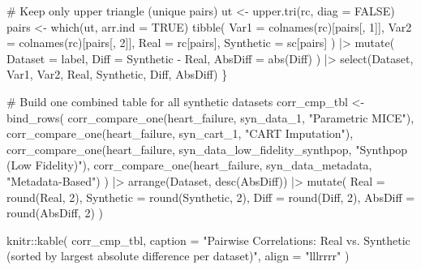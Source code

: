\documentclass[
  letterpaper,
  DIV=11,
  numbers=noendperiod]{scrartcl}
\newenvironment{Shaded}{\begin{snugshade}}{\end{snugshade}}
\newcommand{\AttributeTok}[1]{\textcolor[rgb]{0.40,0.45,0.13}{#1}}
\newcommand{\CommentTok}[1]{\textcolor[rgb]{0.37,0.37,0.37}{#1}}
\newcommand{\ConstantTok}[1]{\textcolor[rgb]{0.56,0.35,0.01}{#1}}
\newcommand{\DecValTok}[1]{\textcolor[rgb]{0.68,0.00,0.00}{#1}}
\newcommand{\FunctionTok}[1]{\textcolor[rgb]{0.28,0.35,0.67}{#1}}
\newcommand{\NormalTok}[1]{\textcolor[rgb]{0.00,0.23,0.31}{#1}}
\newcommand{\OtherTok}[1]{\textcolor[rgb]{0.00,0.23,0.31}{#1}}
\newcommand{\SpecialCharTok}[1]{\textcolor[rgb]{0.37,0.37,0.37}{#1}}
\newcommand{\StringTok}[1]{\textcolor[rgb]{0.13,0.47,0.30}{#1}}
\begin{document}
\begin{Shaded}
\begin{Highlighting}[]
  \CommentTok{\# Keep only upper triangle (unique pairs)}
\NormalTok{  ut }\OtherTok{\textless{}{-}} \FunctionTok{upper.tri}\NormalTok{(rc, }\AttributeTok{diag =} \ConstantTok{FALSE}\NormalTok{)}
\NormalTok{  pairs }\OtherTok{\textless{}{-}} \FunctionTok{which}\NormalTok{(ut, }\AttributeTok{arr.ind =} \ConstantTok{TRUE}\NormalTok{)}
  \FunctionTok{tibble}\NormalTok{(}
    \AttributeTok{Var1 =} \FunctionTok{colnames}\NormalTok{(rc)[pairs[, }\DecValTok{1}\NormalTok{]],}
    \AttributeTok{Var2 =} \FunctionTok{colnames}\NormalTok{(rc)[pairs[, }\DecValTok{2}\NormalTok{]],}
    \AttributeTok{Real =}\NormalTok{ rc[pairs],}
    \AttributeTok{Synthetic =}\NormalTok{ sc[pairs]}
\NormalTok{  ) }\SpecialCharTok{|\textgreater{}}
    \FunctionTok{mutate}\NormalTok{(}
      \AttributeTok{Dataset =}\NormalTok{ label,}
      \AttributeTok{Diff =}\NormalTok{ Synthetic }\SpecialCharTok{{-}}\NormalTok{ Real,}
      \AttributeTok{AbsDiff =} \FunctionTok{abs}\NormalTok{(Diff)}
\NormalTok{    ) }\SpecialCharTok{|\textgreater{}}
    \FunctionTok{select}\NormalTok{(Dataset, Var1, Var2, Real, Synthetic, Diff, AbsDiff)}
\NormalTok{\}}

\CommentTok{\# Build one combined table for all synthetic datasets}
\NormalTok{corr\_cmp\_tbl }\OtherTok{\textless{}{-}} \FunctionTok{bind\_rows}\NormalTok{(}
  \FunctionTok{corr\_compare\_one}\NormalTok{(heart\_failure, syn\_data\_1, }\StringTok{"Parametric MICE"}\NormalTok{),}
  \FunctionTok{corr\_compare\_one}\NormalTok{(heart\_failure, syn\_cart\_1, }\StringTok{"CART Imputation"}\NormalTok{),}
  \FunctionTok{corr\_compare\_one}\NormalTok{(heart\_failure, syn\_data\_low\_fidelity\_synthpop, }\StringTok{"Synthpop (Low Fidelity)"}\NormalTok{),}
  \FunctionTok{corr\_compare\_one}\NormalTok{(heart\_failure, syn\_data\_metadata, }\StringTok{"Metadata{-}Based"}\NormalTok{)}
\NormalTok{) }\SpecialCharTok{|\textgreater{}}
  \FunctionTok{arrange}\NormalTok{(Dataset, }\FunctionTok{desc}\NormalTok{(AbsDiff)) }\SpecialCharTok{|\textgreater{}}
  \FunctionTok{mutate}\NormalTok{(}
    \AttributeTok{Real =} \FunctionTok{round}\NormalTok{(Real, }\DecValTok{2}\NormalTok{),}
    \AttributeTok{Synthetic =} \FunctionTok{round}\NormalTok{(Synthetic, }\DecValTok{2}\NormalTok{),}
    \AttributeTok{Diff =} \FunctionTok{round}\NormalTok{(Diff, }\DecValTok{2}\NormalTok{),}
    \AttributeTok{AbsDiff =} \FunctionTok{round}\NormalTok{(AbsDiff, }\DecValTok{2}\NormalTok{)}
\NormalTok{  )}

\NormalTok{knitr}\SpecialCharTok{::}\FunctionTok{kable}\NormalTok{(}
\NormalTok{  corr\_cmp\_tbl,}
  \AttributeTok{caption =} \StringTok{"Pairwise Correlations: Real vs. Synthetic (sorted by largest absolute difference per dataset)"}\NormalTok{,}
  \AttributeTok{align =} \StringTok{"lllrrrr"}
\NormalTok{)}
\end{Highlighting}
\end{Shaded}
\end{document}
